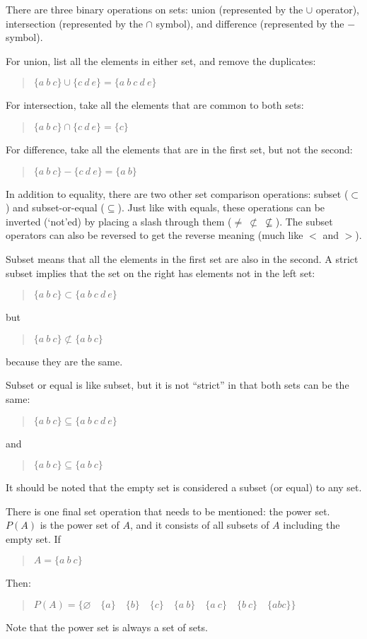 \documentclass[letterpaper,12pt,openany,reqno]{book}%
\begin{document}
There are three binary operations on sets: union (represented by the $\cup$ operator), intersection (represented by the $\cap$ symbol), and difference (represented by the $-$ symbol). 

For union, list all the elements in either set, and remove the duplicates:
\begin{quote}
$\{ a \ b \ c\} \cup \{ c \ d \ e\rbrace = \lbrace a \ b \ c \ d \ e\}$
\end{quote}

For intersection, take all the elements that are common to both sets:
\begin{quote}
$\{ a \ b \ c\} \cap \{ c \ d \ e\} = \{ c \}$
\end{quote}

For difference, take all the elements that are in the first set, but not the second:
\begin{quote}
$\{ a \ b \ c\} - \{ c \ d \ e\} = \{ a \ b \}$
\end{quote}

In addition to equality, there are two other set comparison operations: subset ($\subset$) and subset-or-equal ($\subseteq$). Just like with equals, these operations can be inverted (`not'ed) by placing a slash through them ($\neq \ \not \subset \ \nsubseteq$). The subset operators can also be reversed to get the reverse meaning (much like $<$ and $>$).

Subset means that all the elements in the first set are also in the second. A strict subset implies that the set on the right has elements not in the left set:
\begin{quote}
$\{ a \ b \ c\} \subset \{ a \ b \ c \ d \ e \}$
\end{quote}
but
\begin{quote}
$\{ a \ b \ c\} \not \subset \{ a \ b \ c \}$
\end{quote}
because they are the same.

Subset or equal is like subset, but it is not ``strict'' in that both sets can be the same:
\begin{quote}
$\{ a \ b \ c\} \subseteq \{ a \ b \ c \ d \ e\}$
\end{quote}
and
\begin{quote}
$\{ a \ b \ c\} \subseteq \{ a \ b \ c \}$
\end{quote}

It should be noted that the empty set is considered a subset (or equal) to any set.

There is one final set operation that needs to be mentioned: the power set. $P(A)$ is the power set of $A$, and it consists of all subsets of $A$ including the empty set. If
\begin{quote}
$A = \{ a \ b \ c \}$
\end{quote}
Then:
\begin{quote}
$P(A) = \{ \varnothing \quad \{a\} \quad \{b\} \quad \{c\} \quad \{a \ b\} \quad \{a \ c\} \quad \{b\ c\} \quad \{a b c\}\}$
\end{quote}
Note that the power set is always a set of sets.
\end{document}
